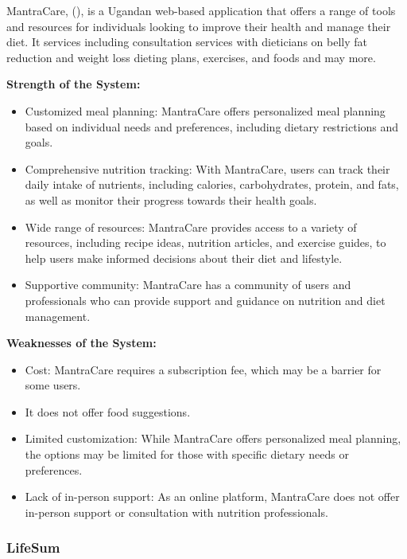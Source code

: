 \documentclass{article}
\begin{document}
MantraCare, (\cite{mantracare}), is a Ugandan web-based application that offers a range of tools and resources for individuals looking to improve their health and manage their diet. It services including consultation services with dieticians on belly fat reduction and weight loss dieting plans, exercises, and foods and may more.

\textbf{Strength of the System:}

\begin{itemize}

\item Customized meal planning: MantraCare offers personalized meal planning based on individual needs and preferences, including dietary restrictions and goals.
\item Comprehensive nutrition tracking: With MantraCare, users can track their daily intake of nutrients, including calories, carbohydrates, protein, and fats, as well as monitor their progress towards their health goals.
\item Wide range of resources: MantraCare provides access to a variety of resources, including recipe ideas, nutrition articles, and exercise guides, to help users make informed decisions about their diet and lifestyle.
\item Supportive community: MantraCare has a community of users and professionals who can provide support and guidance on nutrition and diet management.

\end{itemize}

\textbf{Weaknesses of the System:}

\begin{itemize}
\item Cost: MantraCare requires a subscription fee, which may be a barrier for some users.
\item It does not offer food suggestions.
\item Limited customization: While MantraCare offers personalized meal planning, the options may be limited for those with specific dietary needs or preferences.
\item Lack of in-person support: As an online platform, MantraCare does not offer in-person support or consultation with nutrition professionals.

\end{itemize}
\subsubsection{LifeSum}
\end{document}
